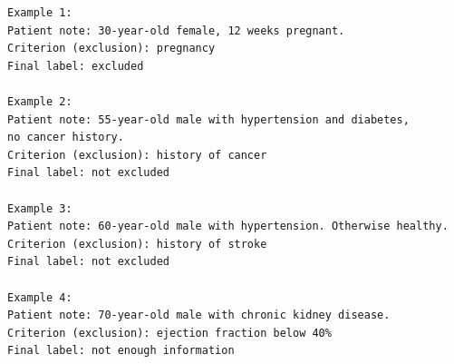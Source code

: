 \begin{lstlisting}[caption={Prompt B for Base models --- exclusion 
    few-shot examples}, label={lst:prompt-b-base-excl}, 
    breaklines=true, basicstyle=\ttfamily\small]
Example 1:
Patient note: 30-year-old female, 12 weeks pregnant.
Criterion (exclusion): pregnancy
Final label: excluded

Example 2:
Patient note: 55-year-old male with hypertension and diabetes,
no cancer history.
Criterion (exclusion): history of cancer
Final label: not excluded

Example 3:
Patient note: 60-year-old male with hypertension. Otherwise healthy.
Criterion (exclusion): history of stroke
Final label: not excluded

Example 4:
Patient note: 70-year-old male with chronic kidney disease.
Criterion (exclusion): ejection fraction below 40%
Final label: not enough information
\end{lstlisting}